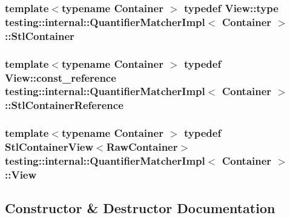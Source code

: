 \subsubsection[{\texorpdfstring{Stl\+Container}{StlContainer}}]{\setlength{\rightskip}{0pt plus 5cm}template$<$typename Container $>$ typedef {\bf View\+::type} {\bf testing\+::internal\+::\+Quantifier\+Matcher\+Impl}$<$ Container $>$\+::{\bf Stl\+Container}}\hypertarget{classtesting_1_1internal_1_1QuantifierMatcherImpl_a7faa9a49c627e6db66e0ff9cdc88b6fc}{}\label{classtesting_1_1internal_1_1QuantifierMatcherImpl_a7faa9a49c627e6db66e0ff9cdc88b6fc}
\subsubsection[{\texorpdfstring{Stl\+Container\+Reference}{StlContainerReference}}]{\setlength{\rightskip}{0pt plus 5cm}template$<$typename Container $>$ typedef {\bf View\+::const\+\_\+reference} {\bf testing\+::internal\+::\+Quantifier\+Matcher\+Impl}$<$ Container $>$\+::{\bf Stl\+Container\+Reference}}\hypertarget{classtesting_1_1internal_1_1QuantifierMatcherImpl_a341dd7815b3c6090d935026daac6e938}{}\label{classtesting_1_1internal_1_1QuantifierMatcherImpl_a341dd7815b3c6090d935026daac6e938}
\subsubsection[{\texorpdfstring{View}{View}}]{\setlength{\rightskip}{0pt plus 5cm}template$<$typename Container $>$ typedef {\bf Stl\+Container\+View}$<$Raw\+Container$>$ {\bf testing\+::internal\+::\+Quantifier\+Matcher\+Impl}$<$ Container $>$\+::{\bf View}}\hypertarget{classtesting_1_1internal_1_1QuantifierMatcherImpl_aa1e6b1653b6fdee1b0cfc4c58a9059e6}{}\label{classtesting_1_1internal_1_1QuantifierMatcherImpl_aa1e6b1653b6fdee1b0cfc4c58a9059e6}


\subsection{Constructor \& Destructor Documentation}
